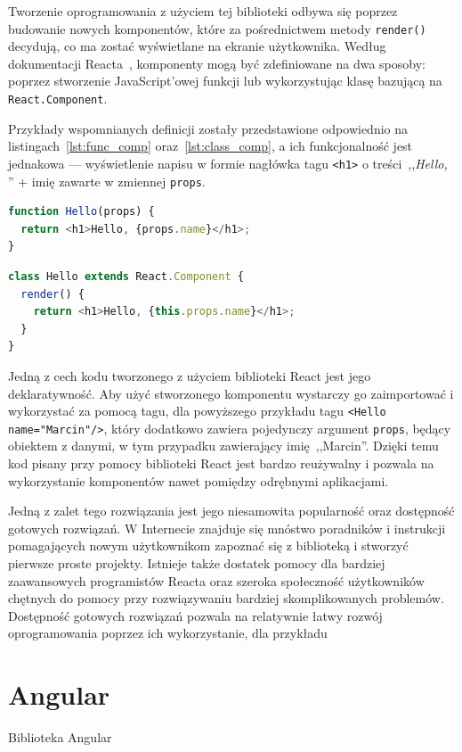 \documentclass[twoside,a4paper]{report}
\begin{document}
Tworzenie oprogramowania z użyciem tej biblioteki odbywa się poprzez budowanie nowych komponentów, które za pośrednictwem metody \texttt{render()} decydują, co ma zostać wyświetlane na ekranie użytkownika.
Według dokumentacji Reacta~\cite{reactdocs}, komponenty mogą być zdefiniowane na dwa sposoby: poprzez stworzenie JavaScript'owej funkcji lub wykorzystując klasę bazującą na \texttt{React.Component}.

Przykłady wspomnianych definicji zostały przedstawione odpowiednio na listingach~\ref{lst:func_comp} oraz~\ref{lst:class_comp}, a ich funkcjonalność jest jednakowa --- wyświetlenie napisu w formie nagłówka tagu \texttt{<h1>} o treści~,,\textit{Hello, }'' + imię zawarte w zmiennej \texttt{props}.


\begin{lstlisting}[caption={Przykład funkcyjnego komponentu},label={lst:func_comp},language=JavaScript]
function Hello(props) {
  return <h1>Hello, {props.name}</h1>;
}
\end{lstlisting}
\begin{lstlisting}[caption={Przykład klasowego komponentu},label={lst:class_comp},language=JavaScript]
class Hello extends React.Component {
  render() {
    return <h1>Hello, {this.props.name}</h1>;
  }
}
\end{lstlisting}

Jedną z cech kodu tworzonego z użyciem biblioteki React jest jego deklaratywność. Aby użyć stworzonego komponentu wystarczy go zaimportować i wykorzystać za pomocą tagu, dla powyższego przykładu tagu \texttt{<Hello name="Marcin"/>}, który dodatkowo zawiera pojedynczy argument \texttt{props}, będący obiektem z danymi, w tym przypadku zawierający imię~,,Marcin''.
Dzięki temu kod pisany przy pomocy biblioteki React jest bardzo reużywalny i pozwala na wykorzystanie komponentów nawet pomiędzy odrębnymi aplikacjami.

Jedną z zalet tego rozwiązania jest jego niesamowita popularność oraz dostępność gotowych rozwiązań.
W Internecie znajduje się mnóstwo poradników i instrukcji pomagających nowym użytkownikom zapoznać się z biblioteką i stworzyć pierwsze proste projekty.
Istnieje także dostatek pomocy dla bardziej zaawansowych programistów Reacta oraz szeroka społeczność użytkowników chętnych do pomocy przy rozwiązywaniu bardziej skomplikowanych problemów.
Dostępność gotowych rozwiązań pozwala na relatywnie łatwy rozwój oprogramowania poprzez ich wykorzystanie, dla przykładu

\section{Angular}
Biblioteka Angular~\cite{angulardocs}
~\cite{angulardocs}
\end{document}
